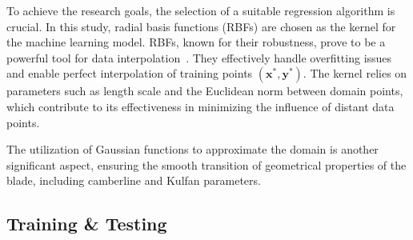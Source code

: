 \documentclass[11pt,a4paper,twocolumn]{article}
\begin{document}
To achieve the research goals, the selection of a suitable regression algorithm is crucial. In this study, radial basis functions (RBFs) are chosen as the kernel for the machine learning model. RBFs, known for their robustness, prove to be a powerful tool for data interpolation~\cite{geron2022hands}. They effectively handle overfitting issues and enable perfect interpolation of training points $(\boldsymbol{x}^*, \boldsymbol{y}^*)$. The kernel relies on parameters such as length scale and the Euclidean norm between domain points, which contribute to its effectiveness in minimizing the influence of distant data points.

The utilization of Gaussian functions to approximate the domain is another significant aspect, ensuring the smooth transition of geometrical properties of the blade, including camberline and Kulfan parameters.

\subsection{Training \& Testing}


\end{document}
